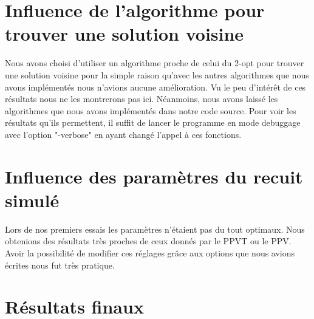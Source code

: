 \documentclass{article}
\begin{document}
\section{Influence de l'algorithme pour trouver une solution voisine}
 
Nous avons choisi d'utiliser un algorithme proche de celui du 2-opt pour trouver une solution voisine pour la simple raison qu'avec les autres algorithmes que nous avons implémentés nous n'avions aucune amélioration.
Vu le peu d'intérêt de ces résultats nous ne les montrerons pas ici.
Néanmoins, nous avons laissé les algorithmes que nous avons implémentés dans notre code source.
Pour voir les résultats qu'ils permettent, il suffit de lancer le programme en mode debuggage avec l'option "-verbose" en ayant changé l'appel à ces fonctions.
 
\section{Influence des paramètres du recuit simulé}
 
Lors de nos premiers essais les paramètres n'étaient pas du tout optimaux.
Nous obtenions des résultats très proches de ceux donnés par le PPVT ou le PPV.
Avoir la possibilité de modifier ces réglages grâce aux options que nous avions écrites nous fut très pratique.
\clearpage
\section{Résultats finaux}
 
\end{document}
